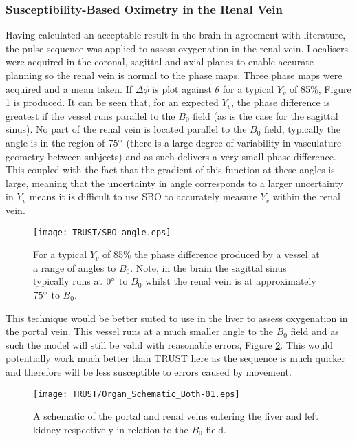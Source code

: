 \subsubsection{Susceptibility-Based Oximetry in the Renal Vein}
Having calculated an acceptable result in the brain in agreement with literature, the pulse sequence was applied to assess oxygenation in the renal vein. Localisers were acquired in the coronal, sagittal and axial planes to enable accurate planning so the renal vein is normal to the phase maps. Three phase maps were acquired and a mean taken. If $\Delta \phi$ is plot against $\theta$ for a typical $Y_v$ of 85\%, Figure \ref{fig:SBO_kidney} is produced. It can be seen that, for an expected $Y_v$, the phase difference is greatest if the vessel runs parallel to the $B_0$ field (as is the case for the sagittal sinus). No part of the renal vein is located parallel to the $B_0$ field, typically the angle is in the region of $75\degree$ (there is a large degree of variability in vasculature geometry between subjects) and as such delivers a very small phase difference. This coupled with the fact that the gradient of this function at these angles is large, meaning that the uncertainty in angle corresponds to a larger uncertainty in $Y_v$ means it is difficult to use \ac{SBO} to accurately measure $Y_v$ within the renal vein.

\begin{figure}[H]
	\centering
	\texttt{[image: TRUST/SBO\_angle.eps]}
	\caption{For a typical $Y_v$ of 85\% the phase difference produced by a vessel at a range of angles to $B_0$. Note, in the brain the sagittal sinus typically runs at $0\degree$ to $B_0$ whilst the renal vein is at approximately $75\degree$ to $B_0$.}
	\label{fig:SBO_kidney}	
\end{figure}
This technique would be better suited to use in the liver to assess oxygenation in the portal vein. This vessel runs at a much smaller angle to the $B_0$ field and as such the model will still be valid with reasonable errors, Figure \ref{fig:PV}. This would potentially work much better than \ac{TRUST} here as the sequence is much quicker and therefore will be less susceptible to errors caused by movement.

\begin{figure}[H]
	\centering
	\texttt{[image: TRUST/Organ\_Schematic\_Both-01.eps]}
	\caption{A schematic of the portal and renal veins entering the liver and left kidney respectively in relation to the $B_0$ field.}
	\label{fig:PV}	
\end{figure}

